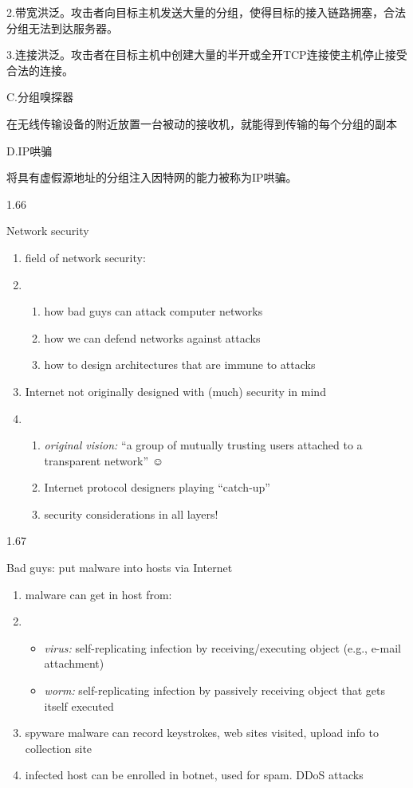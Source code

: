 \documentclass[
]{article}
\begin{document}
2.带宽洪泛。攻击者向目标主机发送大量的分组，使得目标的接入链路拥塞，合法分组无法到达服务器。

3.连接洪泛。攻击者在目标主机中创建大量的半开或全开TCP连接使主机停止接受合法的连接。

C.分组嗅探器

在无线传输设备的附近放置一台被动的接收机，就能得到传输的每个分组的副本

D.IP哄骗

将具有虚假源地址的分组注入因特网的能力被称为IP哄骗。

1.66

Network security

\begin{enumerate}
\def\labelenumi{\arabic{enumi}.}
\item
  field of network security:
\item
  \begin{enumerate}
  \def\labelenumii{\arabic{enumii}.}
  \item
    how bad guys can attack computer networks
  \item
    how we can defend networks against attacks
  \item
    how to design architectures that are immune to attacks
  \end{enumerate}
\item
  Internet not originally designed with (much) security in mind
\item
  \begin{enumerate}
  \def\labelenumii{\arabic{enumii}.}
  \item
    \emph{original vision:} ``a group of mutually trusting users
    attached to a transparent network'' ☺
  \item
    Internet protocol designers playing ``catch-up''
  \item
    security considerations in all layers!
  \end{enumerate}
\end{enumerate}

1.67

Bad guys: put malware into hosts via Internet

\begin{enumerate}
\def\labelenumi{\arabic{enumi}.}
\item
  malware can get in host from:
\item
  \begin{itemize}
  \item
    \emph{virus:} self-replicating infection by receiving/executing
    object (e.g., e-mail attachment)
  \item
    \emph{worm:} self-replicating infection by passively receiving
    object that gets itself executed
  \end{itemize}
\item
  spyware malware can record keystrokes, web sites visited, upload info
  to collection site
\item
  infected host can be enrolled in botnet, used for spam. DDoS attacks
\end{enumerate}
\end{document}
